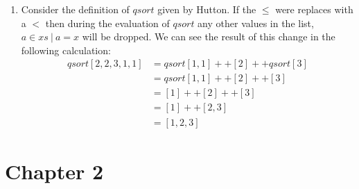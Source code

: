 \documentclass{article}
\begin{document}
\begin{enumerate}
\item Consider the definition of $qsort$ given by Hutton. If the $\leq$ were replaces with a $<$ then during the evaluation of $qsort$ any other values in the list, $a \in xs \ | \  a = x$ will be dropped. We can see the result of this change in the following calculation:
\begin{align*}
qsort [2,2,3,1,1] &= qsort [1, 1]++[2]++qsort[3]\\
&= qsort[1,1]++[2]++[3]\\
&= [1]++[2]++[3]\\
&= [1]++[2,3]\\
&=[1,2,3]
\end{align*}
\end{enumerate}

\section{Chapter 2}
\end{document}
